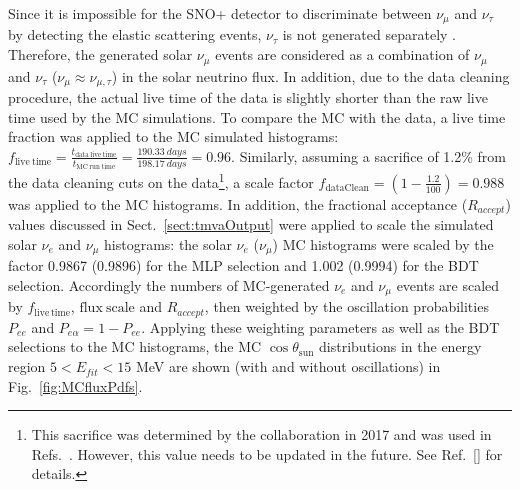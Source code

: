 {Since it is impossible for the SNO+ detector to discriminate between $\nu_\mu$ and $\nu_\tau$ by detecting the elastic scattering events, $\nu_\tau$ is not generated separately \cite{marzec2019measurement}. Therefore, the generated solar $\nu_\mu$ events are considered as a combination of $\nu_\mu$ and $\nu_\tau$ ($\nu_\mu\approx\nu_{\mu,\tau}$) in the solar neutrino flux. In addition, due to the data cleaning procedure, the actual live time of the data is slightly shorter than the raw live time used by the MC simulations. To compare the MC with the data, a live time fraction was applied to the MC simulated histograms: $f_\mathrm{live~time}=\frac{t_\mathrm{data~live~time}}{t_\mathrm{MC~run~time}}=\frac{190.33~days}{198.17~days} = 0.96$. Similarly, assuming a sacrifice of 1.2\% from the data cleaning cuts on the data\footnote{This sacrifice was determined by the collaboration in 2017 \cite{morganDataClean} and was used in Refs.~\cite{marzec2019measurement}. However, this value needs to be updated in the future. See Ref.~\ref{} for details.}, a scale factor $f_\mathrm{dataClean}=(1-\frac{1.2}{100})=0.988$ was applied to the MC histograms. In addition, the fractional acceptance ($R_{accept}$) values discussed in Sect.~\ref{sect:tmvaOutput} were applied to scale the simulated solar $\nu_e$ and $\nu_\mu$ histograms: the solar $\nu_e$ ($\nu_\mu$) MC histograms were scaled by the factor 0.9867 (0.9896) for the MLP selection and 1.002 (0.9994) for the BDT selection. Accordingly the numbers of MC-generated $\nu_e$ and $\nu_\mu$ events are scaled by $f_\mathrm{live\, time}$, $\mathrm{flux~scale}$ and $R_{accept}$, then weighted by the oscillation probabilities $P_{ee}$ and $P_{e\alpha}=1-P_{ee}$. Applying these weighting parameters as well as the BDT selections to the MC histograms, the MC $\cos\theta_\mathrm{sun}$ distributions in the energy region $5<E_{fit}<15$ MeV are shown (with and without oscillations) in Fig.~\ref{fig:MCfluxPdfs}.

}
